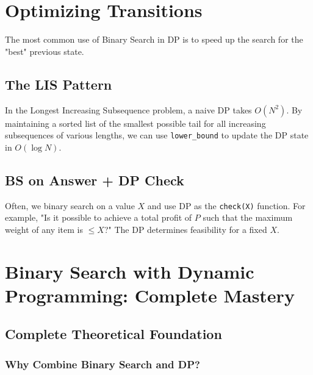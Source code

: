 \documentclass[11pt,a4paper,oneside]{book}
\begin{document}
\section{Optimizing Transitions}

The most common use of Binary Search in DP is to speed up the search for the "best" previous state. 

\subsection{The LIS Pattern}
In the Longest Increasing Subsequence problem, a naive DP takes $O(N^2)$. By maintaining a sorted list of the smallest possible tail for all increasing subsequences of various lengths, we can use \texttt{lower\_bound} to update the DP state in $O(\log N)$.

\subsection{BS on Answer + DP Check}
Often, we binary search on a value $X$ and use DP as the \texttt{check(X)} function. For example, "Is it possible to achieve a total profit of $P$ such that the maximum weight of any item is $\le X$?" The DP determines feasibility for a fixed $X$.

\section{Binary Search with Dynamic Programming: Complete Mastery}

\subsection{Complete Theoretical Foundation}

\subsubsection{Why Combine Binary Search and DP?}
\end{document}

